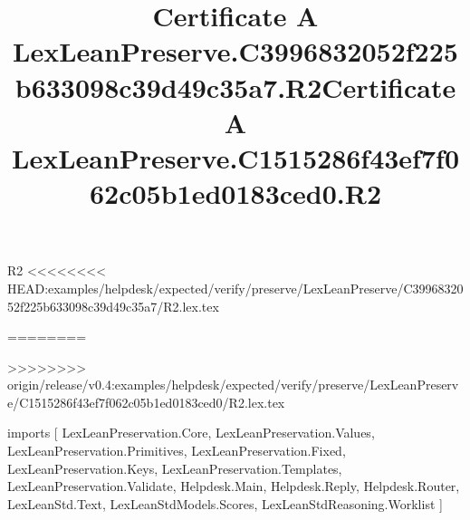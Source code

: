 \begin{lexlean}{R2}
<<<<<<<< HEAD:examples/helpdesk/expected/verify/preserve/LexLeanPreserve/C3996832052f225b633098c39d49c35a7/R2.lex.tex
\title{Certificate A LexLeanPreserve.C3996832052f225b633098c39d49c35a7.R2}
========
\title{Certificate A LexLeanPreserve.C1515286f43ef7f062c05b1ed0183ced0.R2}
>>>>>>>> origin/release/v0.4:examples/helpdesk/expected/verify/preserve/LexLeanPreserve/C1515286f43ef7f062c05b1ed0183ced0/R2.lex.tex
\begin{coremodule}
imports [
  LexLeanPreservation.Core,
  LexLeanPreservation.Values,
  LexLeanPreservation.Primitives,
  LexLeanPreservation.Fixed,
  LexLeanPreservation.Keys,
  LexLeanPreservation.Templates,
  LexLeanPreservation.Validate,
  Helpdesk.Main,
  Helpdesk.Reply,
  Helpdesk.Router,
  LexLeanStd.Text,
  LexLeanStdModels.Scores,
  LexLeanStdReasoning.Worklist
]


\end{coremodule}
\end{lexlean}
